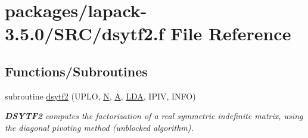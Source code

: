 \hypertarget{dsytf2_8f}{}\section{packages/lapack-\/3.5.0/\+S\+R\+C/dsytf2.f File Reference}
\label{dsytf2_8f}
\subsection*{Functions/\+Subroutines}
\begin{DoxyCompactItemize}
\item 
subroutine \hyperlink{group__doubleSYcomputational_ga4f2a2927b41014f2774c0de468fceddd}{dsytf2} (U\+P\+L\+O, \hyperlink{polmisc_8c_a0240ac851181b84ac374872dc5434ee4}{N}, \hyperlink{classA}{A}, \hyperlink{example__user_8c_ae946da542ce0db94dced19b2ecefd1aa}{L\+D\+A}, I\+P\+I\+V, I\+N\+F\+O)
\begin{DoxyCompactList}\small\item\em {\bfseries D\+S\+Y\+T\+F2} computes the factorization of a real symmetric indefinite matrix, using the diagonal pivoting method (unblocked algorithm). \end{DoxyCompactList}\end{DoxyCompactItemize}
